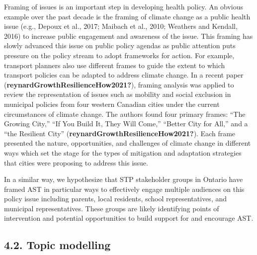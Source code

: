 \documentclass[]{elsarticle} %
\begin{document}
Framing of issues is an important step in developing health policy. An
obvious example over the past decade is the framing of climate change as
a public health issue (e.g., Depoux et al., 2017; Maibach et al., 2010;
Weathers and Kendall, 2016) to increase public engagement and awareness
of the issue. This framing has slowly advanced this issue on public
policy agendas as public attention puts pressure on the policy stream to
adopt frameworks for action. For example, transport planners also use
different frames to guide the extent to which transport policies can be
adapted to address climate change. In a recent paper
(\textbf{reynardGrowthResilienceHow2021?}), framing analysis was applied
to review the representation of issues such as mobility and social
exclusion in municipal policies from four western Canadian cities under
the current circumstances of climate change. The authors found four
primary frames: ``The Growing City,'' ``If You Build It, They Will
Come,'' ``Better City for All,'' and a ``the Resilient City''
(\textbf{reynardGrowthResilienceHow2021?}). Each frame presented the
nature, opportunities, and challenges of climate change in different
ways which set the stage for the types of mitigation and adaptation
strategies that cities were proposing to address this issue.

In a similar way, we hypothesize that STP stakeholder groups in Ontario
have framed AST in particular ways to effectively engage multiple
audiences on this policy issue including parents, local residents,
school representatives, and municipal representatives. These groups are
likely identifying points of intervention and potential opportunities to
build support for and encourage AST.

\hypertarget{topic-modelling}{%
\subsection{4.2. Topic modelling}\label{topic-modelling}}
\end{document}
